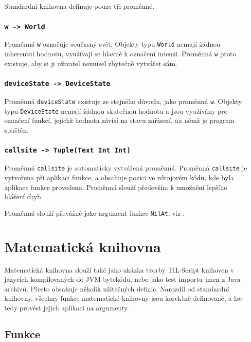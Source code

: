 Standardní knihovna definuje pouze tři proměnné.

\subsubsection{\lstinline{w -> World}}

Proměnná \lstinline{w} označuje současný svět. Objekty typu \lstinline{World} nemají žádnou
inherentní hodnotu, využívají se hlavně k označení intenzí. Proměnná \lstinline{w} proto existuje,
aby si ji uživatel nemusel zbytečně vytvářet sám.

\subsubsection{\lstinline{deviceState -> DeviceState}}

Proměnná \lstinline{deviceState} existuje ze stejného důvodu, jako proměnná \lstinline{w}. Objekty
typu \lstinline{DeviceState} nemají žádnou skutečnou hodnotu a jsou využívány pro označení funkcí,
jejichž hodnota závisí na stavu zařízení, na němž je program spuštěn.

\subsubsection{\lstinline{callsite -> Tuple(Text Int Int)}}\label{callsite-var}

Proměnná \lstinline{callsite} je automaticky vytvářená proměnná. Proměnná \lstinline{callsite}
je vytvořena při aplikaci funkce, a obsahuje pozici ve zdrojovém kódu, kde byla aplikace funkce
provedena. Proměnná slouží především k umožnění lepšího hlášení chyb.

Proměnná slouží převážně jako argument funkce \lstinline{NilAt}, viz .

\section{Matematická knihovna}

Matematická knihovna slouží také jako ukázka tvorby TIL-Script knihoven v jazycích kompilovaných
do JVM bytekódu, nebo jako test importu jmen z Java archivů. Přesto obsahuje několik užitečných
definic. Narozdíl od standardní knihovny, všechny funkce matematické knihovny jsou korektně
definované, a lze tedy provést jejich aplikaci na argumenty.

\subsection{Funkce}

